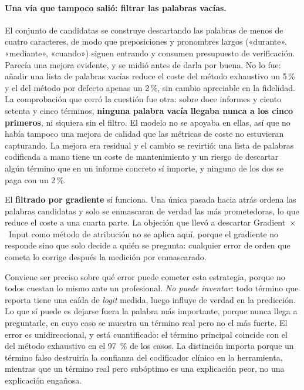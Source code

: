 \paragraph{Una vía que tampoco salió: filtrar las palabras vacías.}
El conjunto de candidatas se construye descartando las palabras de menos de cuatro caracteres, de modo que preposiciones y pronombres largos («durante», «mediante», «cuando») siguen entrando y consumen presupuesto de verificación. Parecía una mejora evidente, y se midió antes de darla por buena. No lo fue: añadir una lista de palabras vacías reduce el coste del método exhaustivo un 5\,\% y el del método por defecto apenas un 2\,\%, sin cambio apreciable en la fidelidad. La comprobación que cerró la cuestión fue otra: sobre doce informes y ciento setenta y cinco términos, \textbf{ninguna palabra vacía llegaba nunca a los cinco primeros}, ni siquiera sin el filtro. El modelo no se apoyaba en ellas, así que no había tampoco una mejora de calidad que las métricas de coste no estuvieran capturando. La mejora era residual y el cambio se revirtió: una lista de palabras codificada a mano tiene un coste de mantenimiento y un riesgo de descartar algún término que en un informe concreto sí importe, y ninguno de los dos se paga con un 2\,\%.

El \textbf{filtrado por gradiente} sí funciona. Una única pasada hacia atrás ordena las palabras candidatas y solo se enmascaran de verdad las más prometedoras, lo que reduce el coste a una cuarta parte. La objeción que llevó a descartar Gradient~$\times$~Input como método de atribución no se aplica aquí, porque el gradiente no responde sino que solo decide a quién se pregunta: cualquier error de orden que cometa lo corrige después la medición por enmascarado.

Conviene ser preciso sobre qué error puede cometer esta estrategia, porque no todos cuestan lo mismo ante un profesional. \emph{No puede inventar}: todo término que reporta tiene una caída de \emph{logit} medida, luego influye de verdad en la predicción. Lo que sí puede es dejarse fuera la palabra más importante, porque nunca llega a preguntarle, en cuyo caso se muestra un término real pero no el más fuerte. El error es unidireccional, y está cuantificado: el término principal coincide con el del método exhaustivo en el 97~\% de los casos. La distinción importa porque un término falso destruiría la confianza del codificador clínico en la herramienta, mientras que un término real pero subóptimo es una explicación peor, no una explicación engañosa.

